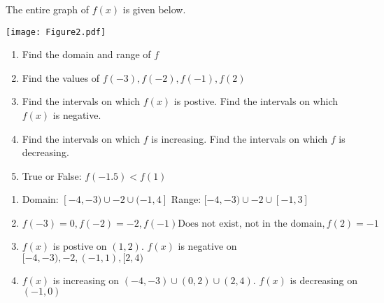 \documentclass[noinstructornotes]{ximera}
\begin{document}
\begin{problem}
The entire graph of $f(x)$ is given below.

	\begin{image}
	\texttt{[image: Figure2.pdf]}
	\end{image}

\begin{enumerate}	
	\item  Find the domain and range of $f$
	
	\item  Find the values of $f(-3),f(-2), f(-1),f(2)$


	\item  Find the intervals on which $f(x)$ is postive.  Find the intervals on which $f(x)$ is negative.

	\item Find the intervals on which $f$ is increasing.  Find the intervals on which $f$ is decreasing.

	\item True or False: $f(-1.5) < f(1)$

	
	\end{enumerate}
	
	\begin{freeResponse}
		\begin{enumerate}
		
		\item Domain: $[-4,-3)\cup{-2}\cup(-1,4]$
			Range: $[-4,-3)\cup{-2}\cup[-1,3]$

		\item $f(-3)=0, f(-2)=-2, f(-1) \text{Does not exist, not in the domain}, f(2)=-1$
 
		
		\item  $f(x)$ is postive on $(1,2)$. $f(x)$ is negative on $[-4,-3),{-2},(-1,1),[2,4)$

		\item $f(x)$ is increasing on $(-4,-3)\cup(0,2)\cup(2,4)$.  $f(x)$ is decreasing on $(-1,0)$
		
		\end{enumerate}
	\end{freeResponse}
	
\end{problem}

\begin{instructorNotes}

\end{instructorNotes}
\end{document}
